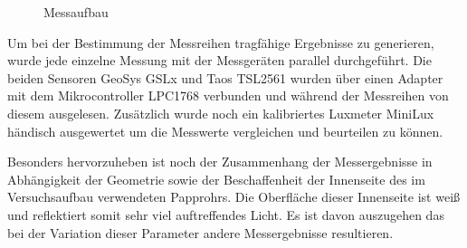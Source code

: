 \documentclass[a4paper,12pt]{scrartcl}
\begin{document}
\begin{figure}[H] 
  \caption{\label{fotohwmessaufbau}Messaufbau}
\end{figure} 

Um bei der Bestimmung der Messreihen tragfähige Ergebnisse zu generieren, wurde jede einzelne Messung mit der Messgeräten parallel durchgeführt. Die beiden
Sensoren GeoSys GSLx und Taos TSL2561 wurden über einen Adapter mit dem Mikrocontroller LPC1768 verbunden und während der Messreihen von diesem ausgelesen.
Zusätzlich wurde noch ein kalibriertes Luxmeter MiniLux händisch ausgewertet um die Messwerte vergleichen und beurteilen zu können. 

Besonders hervorzuheben ist noch der Zusammenhang der Messergebnisse in Abhängigkeit der Geometrie sowie der Beschaffenheit der Innenseite des im Versuchsaufbau
verwendeten Papprohrs. Die Oberfläche dieser Innenseite ist weiß und reflektiert somit sehr viel auftreffendes Licht. Es ist davon auszugehen das bei der
Variation dieser Parameter andere Messergebnisse resultieren.
\end{document}
